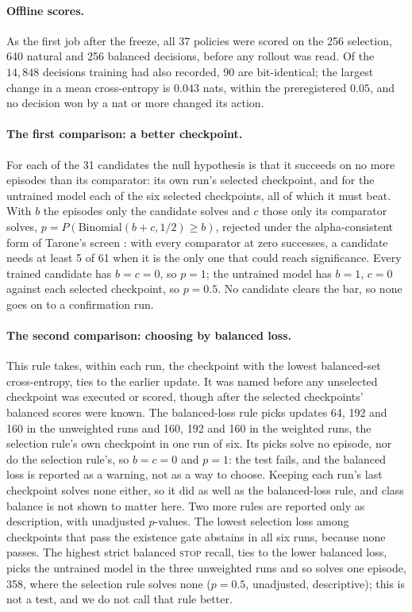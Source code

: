 \paragraph{Offline scores.}
As the first job after the freeze, all 37 policies were scored on the 256 selection, 640 natural
and 256 balanced decisions, before any rollout was read. Of the $14{,}848$ decisions training had
also recorded, 90 are bit-identical; the largest change in a mean cross-entropy is $0.043$ nats,
within the preregistered $0.05$, and no decision won by a nat or more changed its action.

\paragraph{The first comparison: a better checkpoint.}
For each of the 31 candidates the null hypothesis is that it succeeds on no more episodes than its
comparator: its own run's selected checkpoint, and for the untrained model each of the six selected
checkpoints, all of which it must beat. With $b$ the episodes only the candidate solves and $c$ those
only its comparator solves, $p=P(\mathrm{Binomial}(b+c,1/2)\ge b)$, rejected under the
alpha-consistent form of Tarone's screen \citep{tarone1990modified,hommel1998improvements}: with
every comparator at zero successes, a candidate needs at least 5 of 61 when it is the only one that
could reach significance. Every trained candidate has $b=c=0$, so $p=1$; the untrained model has
$b=1$, $c=0$ against each selected checkpoint, so $p=0.5$. No candidate clears the bar, so
none goes on to a confirmation run.

\paragraph{The second comparison: choosing by balanced loss.}
This rule takes, within each run, the checkpoint with the lowest balanced-set cross-entropy, ties to the
earlier update. It was named before any unselected checkpoint was executed or scored, though after
the selected checkpoints' balanced scores were known. The balanced-loss rule picks updates 64, 192 and 160 in the
unweighted runs and 160, 192 and 160 in the weighted runs, the selection rule's own checkpoint in
one run of six. Its picks solve no episode, nor do the selection rule's, so $b=c=0$ and $p=1$: the
test fails, and the balanced loss is reported as a warning, not as a way to choose. Keeping each
run's last checkpoint solves none either, so it did as well as the balanced-loss rule, and class balance is not shown
to matter here. Two more rules are
reported only as description, with unadjusted $p$-values.
The lowest selection loss among checkpoints that pass the existence gate abstains in all six runs,
because none passes. The highest strict balanced \textsc{stop} recall, ties to the lower balanced
loss, picks the untrained model in the three unweighted runs and so solves one episode, 358, where
the selection rule solves none ($p=0.5$, unadjusted, descriptive); this is not a test, and we do not
call that rule better.

